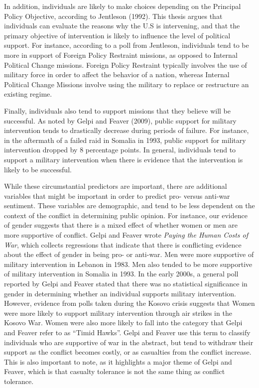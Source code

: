 \documentclass[
  11pt,
]{article}
\begin{document}
In addition, individuals are likely to make choices depending on the
Principal Policy Objective, according to Jentleson (1992). This thesis
argues that individuals can evaluate the reasons why the U.S is
intervening, and that the primary objective of intervention is likely to
influence the level of political support. For instance, according to a
poll from Jentleson, individuals tend to be more in support of Foreign
Policy Restraint missions, as opposed to Internal Political Change
missions. Foreign Policy Restraint typically involves the use of
military force in order to affect the behavior of a nation, whereas
Internal Political Change Missions involve using the military to replace
or restructure an existing regime.

Finally, individuals also tend to support missions that they believe
will be successful. As noted by Gelpi and Feaver (2009), public support
for military intervention tends to drastically decrease during periods
of failure. For instance, in the aftermath of a failed raid in Somalia
in 1993, public support for military intervention dropped by 8
percentage points. In general, individuals tend to support a military
intervention when there is evidence that the intervention is likely to
be successful.

While these circumstantial predictors are important, there are
additional variables that might be important in order to predict pro-
versus anti-war sentiment. These variables are demographic, and tend to
be less dependent on the context of the conflict in determining public
opinion. For instance, our evidence of gender suggests that there is a
mixed effect of whether women or men are more supportive of conflict.
Gelpi and Feaver wrote \emph{Paying the Human Costs of War}, which
collects regressions that indicate that there is conflicting evidence
about the effect of gender in being pro- or anti-war. Men were more
supportive of military intervention in Lebanon in 1983. Men also tended
to be more supportive of military intervention in Somalia in 1993. In
the early 2000s, a general poll reported by Gelpi and Feaver stated that
there was no statistical significance in gender in determining whether
an individual supports military intervention. However, evidence from
polls taken during the Kosovo crisis suggests that Women were more
likely to support military intervention through air strikes in the
Kosovo War. Women were also more likely to fall into the category that
Gelpi and Feaver refer to as ``Timid Hawks''. Gelpi and Feaver use this
term to classify individuals who are supportive of war in the abstract,
but tend to withdraw their support as the conflict becomes costly, or as
casualties from the conflict increase. This is also important to note,
as it highlights a major theme of Gelpi and Feaver, which is that
casualty tolerance is not the same thing as conflict tolerance.
\end{document}
